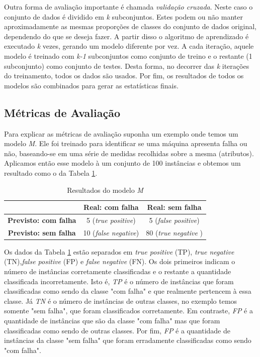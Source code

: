Outra forma de avaliação importante é chamada \textit{validação cruzada}.
Neste caso o conjunto de dados é dividido em \textit{k} subconjuntos.
Estes podem ou não manter aproximadamente as mesmas proporções de classes do conjunto de dados original, dependendo do que se deseja fazer.
A partir disso o algoritmo de aprendizado é executado \textit{k} vezes, gerando um modelo diferente por vez.
A cada iteração, aquele modelo é treinado com \textit{k-1} subconjuntos como conjunto de treino e o restante (1 subconjunto) como conjunto de testes.
Desta forma, no decorrer das \textit{k} iterações do treinamento, todos os dados são usados.
Por fim, os resultados de todos os modelos são combinados para gerar as estatísticas finais.

\subsection{Métricas de Avaliação}

Para explicar as métricas de avaliação suponha um exemplo onde temos um modelo \textit{M}.
Ele foi treinado para identificar se uma máquina apresenta falha ou não, baseando-se em uma série de medidas recolhidas sobre a mesma (atributos).
Aplicamos então esse modelo à um conjunto de 100 instâncias e obtemos um resultado como o da Tabela \ref{tab:positivosenegativos}.

\begin{table}[h!]
  \begin{center}
    \begin{tabular}{ccc}
      \hline
        & \textbf{Real: com falha} & \textbf{Real: sem falha} \\
      \hline

      \textbf{Previsto: com falha} & 5 (\textit{true positive}) & 5 (\textit{false positive}) \\
      \textbf{Previsto: sem falha} & 10 (\textit{false negative}) & 80 (\textit{true negative} )\\

      \hline
    \end{tabular}
    \caption{Resultados do modelo \textit{M}}
    \label{tab:positivosenegativos}
  \end{center}
\end{table}

Os dados da Tabela \ref{tab:positivosenegativos} estão separados em \textit{true positive} (TP), \textit{true negative} (TN),\textit{false positive} (FP) e \textit{false negative} (FN).
Os dois primeiros indicam o número de instâncias corretamente classificadas e o restante a quantidade classificada incorretamente.
Isto é, \textit{TP} é o número de instâncias que foram classificadas como sendo da classe "com falha" e que realmente pertencem à essa classe.
Já \textit{TN} é o número de instâncias de outras classes, no exemplo temos somente "sem falha", que foram classificados corretamente.
Em contraste, \textit{FP} é a quantidade de instâncias que são da classe "com falha" mas que foram classificadas como sendo de outras classes.
Por fim, \textit{FP} é a quantidade de instâncias da classe "sem falha" que foram erradamente classificadas como sendo "com falha".


